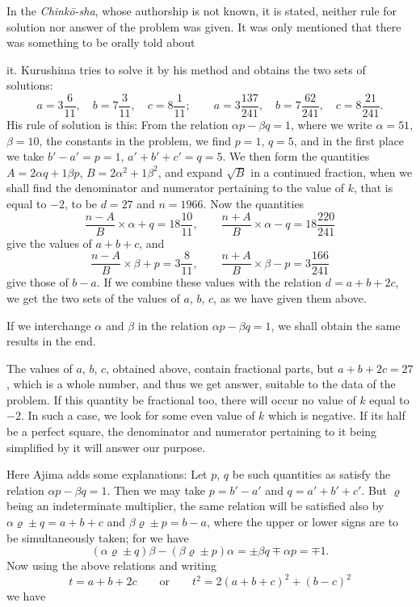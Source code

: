 \documentclass[11pt]{article}
\newcommand{\scanpage}[2]{\clearpage\setcounter{footnote}{0}\noindent{\footnotesize\color{gray}PDF page #1 · #2}\par\medskip}
\newcommand{\scanfooter}{}
\begin{document}
In the \emph{Chinkō-sha}, whose authorship is not known, it is stated, neither rule for solution nor answer of the problem was given. It was only mentioned that there was something to be orally told about
\scanfooter

\scanpage{0242}{Chapter 31, printed page 228}
it. Kurushima tries to solve it by his method and obtains the two sets of solutions:
\[
a=3\frac6{11},\quad b=7\frac3{11},\quad c=8\frac1{11};
\qquad
a=3\frac{137}{241},\quad b=7\frac{62}{241},\quad c=8\frac{21}{241}.
\]
His rule of solution is this: From the relation $\alpha p-\beta q=1$, where we write $\alpha=51$, $\beta=10$, the constants in the problem, we find $p=1$, $q=5$, and in the first place we take $b'-a'=p=1$, $a'+b'+c'=q=5$. We then form the quantities $A=2\alpha q+1\beta p$, $B=2\alpha^2+1\beta^2$, and expand $\sqrt B$ in a continued fraction, when we shall find the denominator and numerator pertaining to the value of $k$, that is equal to $-2$, to be $d=27$ and $n=1966$. Now the quantities
\[
\frac{n-A}{B}\times\alpha+q=18\frac{10}{11},
\qquad
\frac{n+A}{B}\times\alpha-q=18\frac{220}{241}
\]
give the values of $a+b+c$, and
\[
\frac{n-A}{B}\times\beta+p=3\frac8{11},
\qquad
\frac{n+A}{B}\times\beta-p=3\frac{166}{241}
\]
give those of $b-a$. If we combine these values with the relation $d=a+b+2c$, we get the two sets of the values of $a$, $b$, $c$, as we have given them above.

If we interchange $\alpha$ and $\beta$ in the relation $\alpha p-\beta q=1$, we shall obtain the same results in the end.

The values of $a$, $b$, $c$, obtained above, contain fractional parts, but $a+b+2c=27$, which is a whole number, and thus we get answer, suitable to the data of the problem. If this quantity be fractional too, there will occur no value of $k$ equal to $-2$. In such a case, we look for some even value of $k$ which is negative. If its half be a perfect square, the denominator and numerator pertaining to it being simplified by it will answer our purpose.

Here Ajima adds some explanations: Let $p$, $q$ be such quantities as satisfy the relation $\alpha p-\beta q=1$. Then we may take $p=b'-a'$ and $q=a'+b'+c'$. But $\varrho$ being an indeterminate multiplier, the same relation will be satisfied also by $\alpha\varrho\pm q=a+b+c$ and $\beta\varrho\pm p=b-a$, where the upper or lower signs are to be simultaneously taken; for we have
\[
(\alpha\varrho\pm q)\beta-(\beta\varrho\pm p)\alpha
=\pm\beta q\mp\alpha p=\mp1.
\]
Now using the above relations and writing
\[
t=a+b+2c\qquad\text{or}\qquad t^2=2(a+b+c)^2+(b-c)^2
\]
we have
\scanfooter
\end{document}
